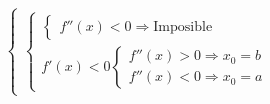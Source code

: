 \[{\begin{cases}
\begin{cases}
\begin{cases}
                                        f''(x) < 0 \Rightarrow \text{Imposible}
                                \end{cases}
                                \\
                                f'(x) < 0
                                \begin{cases}
                                        f''(x) > 0 \Rightarrow x_0 = b
                                        \\
                                        f''(x) < 0 \Rightarrow x_0 = a
                                \end{cases}
                        \end{cases}
                \end{cases}}
\]